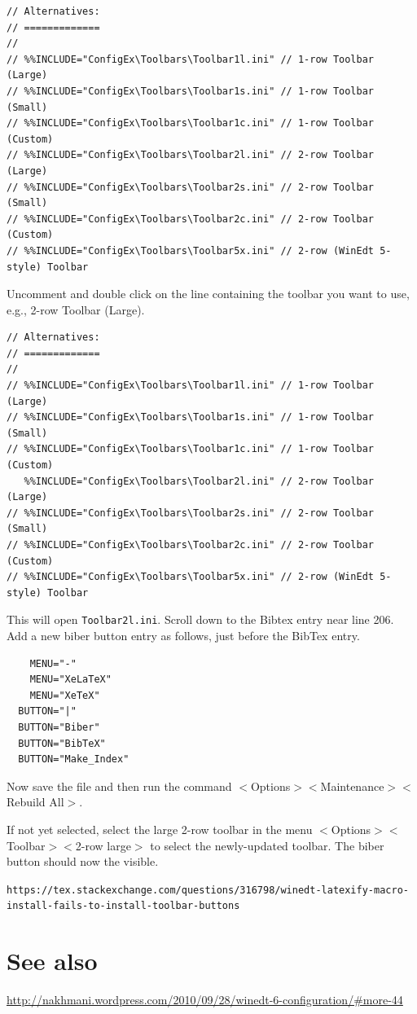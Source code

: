 \begin{lstlisting}
// Alternatives:
// =============
//
// %%INCLUDE="ConfigEx\Toolbars\Toolbar1l.ini" // 1-row Toolbar (Large)
// %%INCLUDE="ConfigEx\Toolbars\Toolbar1s.ini" // 1-row Toolbar (Small)
// %%INCLUDE="ConfigEx\Toolbars\Toolbar1c.ini" // 1-row Toolbar (Custom)
// %%INCLUDE="ConfigEx\Toolbars\Toolbar2l.ini" // 2-row Toolbar (Large)
// %%INCLUDE="ConfigEx\Toolbars\Toolbar2s.ini" // 2-row Toolbar (Small)
// %%INCLUDE="ConfigEx\Toolbars\Toolbar2c.ini" // 2-row Toolbar (Custom)
// %%INCLUDE="ConfigEx\Toolbars\Toolbar5x.ini" // 2-row (WinEdt 5-style) Toolbar
\end{lstlisting}

Uncomment and double click on the line containing the toolbar you want to use, e.g.,  2-row Toolbar (Large).

\begin{lstlisting}
// Alternatives:
// =============
//
// %%INCLUDE="ConfigEx\Toolbars\Toolbar1l.ini" // 1-row Toolbar (Large)
// %%INCLUDE="ConfigEx\Toolbars\Toolbar1s.ini" // 1-row Toolbar (Small)
// %%INCLUDE="ConfigEx\Toolbars\Toolbar1c.ini" // 1-row Toolbar (Custom)
   %%INCLUDE="ConfigEx\Toolbars\Toolbar2l.ini" // 2-row Toolbar (Large)
// %%INCLUDE="ConfigEx\Toolbars\Toolbar2s.ini" // 2-row Toolbar (Small)
// %%INCLUDE="ConfigEx\Toolbars\Toolbar2c.ini" // 2-row Toolbar (Custom)
// %%INCLUDE="ConfigEx\Toolbars\Toolbar5x.ini" // 2-row (WinEdt 5-style) Toolbar
\end{lstlisting}

This will open \lstinline{Toolbar2l.ini}. Scroll down to the Bibtex entry near line 206.  Add a new biber button entry as follows, just before the BibTex entry.

\begin{lstlisting}
    MENU="-"
    MENU="XeLaTeX"
    MENU="XeTeX"
  BUTTON="|"
  BUTTON="Biber"
  BUTTON="BibTeX"
  BUTTON="Make_Index"
\end{lstlisting}

Now save the file and then run the command $<$Options$>$$<$Maintenance$>$$<$Rebuild All$>$.

If not yet selected, select the large 2-row toolbar in the menu
$<$Options$>$$<$Toolbar$>$$<$2-row large$>$ to select the newly-updated toolbar.  The biber button should now the visible.


\lstinline{https://tex.stackexchange.com/questions/316798/winedt-latexify-macro-install-fails-to-install-toolbar-buttons}

\section{See also}

\url{http://nakhmani.wordpress.com/2010/09/28/winedt-6-configuration/#more-44}


